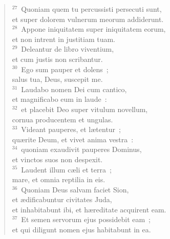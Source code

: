 \begin{flushleft}
\begin{verse}
${}^{27}$~Quoniam quem tu percussisti persecuti sunt,\\ et super dolorem vulnerum meorum addiderunt.\\
${}^{28}$~Appone iniquitatem super iniquitatem eorum,\\ et non intrent in justitiam tuam.\\
${}^{29}$~Deleantur de libro viventium,\\ et cum justis non scribantur.\\
${}^{30}$~Ego sum pauper et dolens~;\\ salus tua, Deus, suscepit me.\\
${}^{31}$~Laudabo nomen Dei cum cantico,\\ et magnificabo eum in laude~:\\
${}^{32}$~et placebit Deo super vitulum novellum,\\ cornua producentem et ungulas.\\
${}^{33}$~Videant pauperes, et l\ae tentur~;\\ qu\ae rite Deum, et vivet anima vestra~:\\
${}^{34}$~quoniam exaudivit pauperes Dominus,\\ et vinctos suos non despexit.\\
${}^{35}$~Laudent illum c\ae li et terra~;\\ mare, et omnia reptilia in eis.\\
${}^{36}$~Quoniam Deus salvam faciet Sion,\\ et \ae dificabuntur civitates Juda,\\ et inhabitabunt ibi, et h\ae reditate acquirent eam.\\
${}^{37}$~Et semen servorum ejus possidebit eam~;\\ et qui diligunt nomen ejus habitabunt in ea.\end{verse}\end{flushleft}


